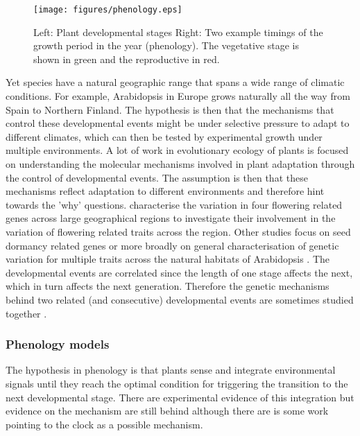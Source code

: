 \begin{figure}[tb]
\centering
\texttt{[image: figures/phenology.eps]}
  \caption{Left: Plant developmental stages Right: Two example timings of the
    growth period in the year (phenology). The vegetative stage is shown in
    green and the reproductive in red.}
\label{fig:plantLife}
\end{figure}

Yet species have a natural geographic range that spans a wide range of climatic
conditions. For example, Arabidopsis in Europe grows naturally all the way from
Spain to Northern Finland. The hypothesis is then that the mechanisms that
control these developmental events might be under selective pressure to adapt to
different climates, which can then be tested by experimental growth under
multiple environments. A lot of work in evolutionary ecology of plants is
focused on understanding the molecular mechanisms involved in plant adaptation
through the control of developmental events. The assumption is then that these
mechanisms reflect adaptation to different environments and therefore hint
towards the 'why' questions. \citet{mendez-vigo_altitudinal_2011} characterise
the variation in four flowering related genes across large geographical regions
to investigate their involvement in the variation of flowering related traits
across the region. Other studies focus on seed dormancy related genes
\citep{chiang_dog1_2011} or more broadly on general characterisation of genetic
variation for multiple traits across the natural habitats of Arabidopsis
\citep{atwell_genome-wide_2010}. The developmental events are correlated since
the length of one stage affects the next, which in turn affects the next
generation. Therefore the genetic mechanisms behind two related (and
consecutive) developmental events are sometimes studied together
\citep{debieu_co-variation_2013}.

\subsubsection*{Phenology models}
The hypothesis in phenology is that plants sense and integrate environmental
signals until they reach the optimal condition for triggering the transition to
the next developmental stage. There are experimental evidence of this
integration but evidence on the mechanism are still behind although there are is
some work pointing to the clock as a possible mechanism.

